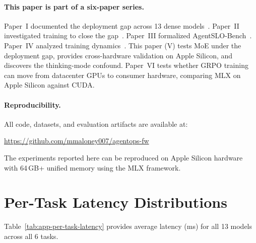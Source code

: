 \documentclass[11pt]{article}
\begin{document}
\paragraph{This paper is part of a six-paper series.}
Paper~I documented the deployment gap across 13 dense models~\citep{maloney2025deploymentgap}.
Paper~II investigated training to close the gap~\citep{maloney2025capacity}.
Paper~III formalized AgentSLO-Bench~\citep{maloney2025agentslobench}.
Paper~IV analyzed training dynamics~\citep{maloney2025dynamics}.
This paper (V) tests MoE under the deployment gap, provides cross-hardware validation on Apple Silicon, and discovers the thinking-mode confound.
Paper~VI tests whether GRPO training can move from datacenter GPUs to consumer hardware, comparing MLX on Apple Silicon against CUDA.

\paragraph{Reproducibility.}
All code, datasets, and evaluation artifacts are available at:
\begin{center}
\url{https://github.com/mmaloney007/agentops-fw}
\end{center}
The experiments reported here can be reproduced on Apple Silicon hardware with 64\,GB+ unified memory using the MLX framework.




\appendix

\section{Per-Task Latency Distributions}
\label{app:per-task-latency}

Table~\ref{tab:app-per-task-latency} provides average latency (ms) for all 13 models across all 6 tasks.
\end{document}
